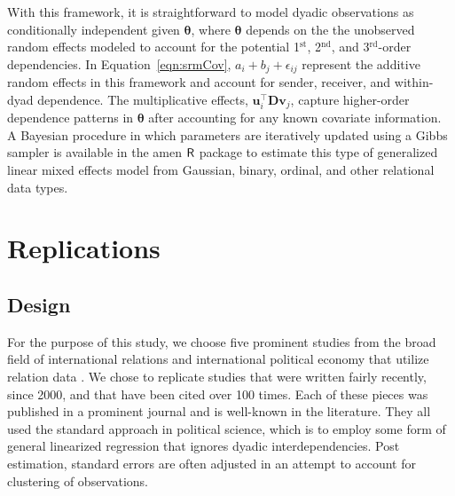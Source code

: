 \documentclass[12pt]{amsart}
\newcommand{\first}{1$^{\text{st}}$}
\newcommand{\second}{2$^{\text{nd}}$}
\newcommand{\third}{3$^{\text{rd}}$}
\newcommand{\pkg}[1]{{\fontseries{b}\selectfont #1}}
\begin{document}
With this framework, it is straightforward to model dyadic observations as conditionally independent given $\bm\theta$, where $\bm\theta$ depends on the the unobserved random effects modeled to account for the potential \first, \second, and \third-order dependencies. In Equation~\ref{eqn:srmCov}, $a_{i} + b_{j}  + \epsilon_{ij}$ represent the additive random effects in this framework and account for sender, receiver, and within-dyad dependence. The multiplicative effects, $\textbf{u}_{i}^{\top} \textbf{D} \textbf{v}_{j}$, capture higher-order dependence patterns in $\bm\theta$ after accounting for any known covariate information. A Bayesian procedure in which parameters are iteratively updated using a Gibbs sampler is available in the \pkg{amen} $\sf{R}$ package to estimate this type of generalized linear mixed effects model from Gaussian, binary, ordinal, and other relational data types.

\section{Replications}
 
\subsection{Design}

For the purpose of this study, we choose five prominent studies from the broad field of international relations and international political economy that utilize relation data \citep{mcdonald:2004, reiter:stam:2003, rose:2004, weeks:2012, gibler:2017}. We chose to replicate studies that were written fairly recently, since 2000, and that have been cited over 100 times. Each of these pieces was published in a prominent journal and is well-known in the literature. They all used the standard approach in political science, which is to employ some form of general linearized regression that ignores dyadic interdependencies. Post estimation, standard errors are often adjusted in an attempt to account for clustering of observations.

\begin{table}
\caption{Features of the Studies Replicated. }
\end{table}
\end{document}
